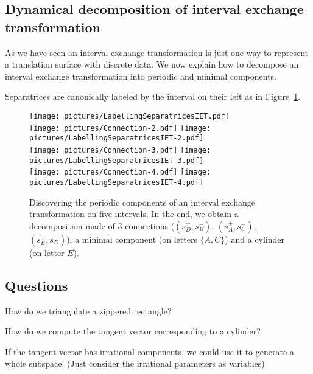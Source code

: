 \documentclass[a4paper,12pt]{article}
\begin{document}
\subsection{Dynamical decomposition of interval exchange transformation}

As we have seen an interval exchange transformation is just one way to represent
a translation surface with discrete data. We now explain how to decompose an
interval exchange transformation into periodic and minimal components.

Separatrices are canonically labeled by the interval on their left as in
Figure~\ref{fig:LabellingSeparatricesIET}.
\begin{figure}[!ht]
\begin{center}
\texttt{[image: pictures/LabellingSeparatricesIET.pdf]} \\
\texttt{[image: pictures/Connection-2.pdf]}%
\hspace{0.5cm}%
\texttt{[image: pictures/LabellingSeparatricesIET-2.pdf]} \\
\texttt{[image: pictures/Connection-3.pdf]}%
\hspace{0.5cm}%
\texttt{[image: pictures/LabellingSeparatricesIET-3.pdf]} \\
\texttt{[image: pictures/Connection-4.pdf]}%
\hspace{0.5cm}%
\texttt{[image: pictures/LabellingSeparatricesIET-4.pdf]}
\end{center}
\caption{Discovering the periodic components of an interval exchange transformation
on five intervals. In the end, we obtain a decomposition made of 3 connections
($(s^+_D, s^-_B)$, $(s^+_A, s^-_C)$, $(s^+_E, s^-_D)$),
a minimal component (on letters $\{A, C\}$) and a cylinder (on letter $E$).}
\label{fig:LabellingSeparatricesIET}
\end{figure}

\subsection{Questions}
How do we triangulate a zippered rectangle?

How do we compute the tangent vector corresponding to a cylinder?

If the tangent vector has irrational components, we could use it to generate a whole subspace!
(Just consider the irrational parameters as variables)
\end{document}
